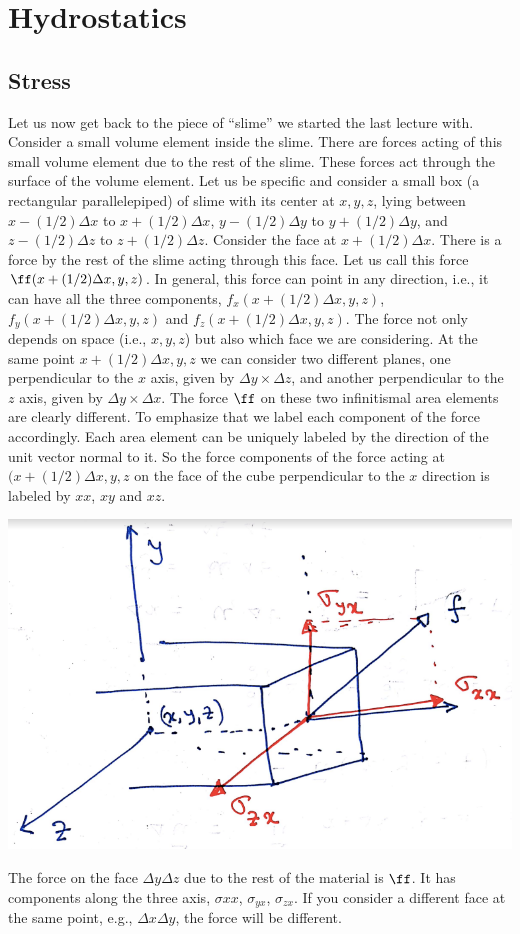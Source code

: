 \chapter{Hydrostatics}
\label{ch:hydrostatics}
\section{Stress}
Let us now get back to the piece of ``slime'' we started the last
lecture with. Consider a small volume element inside the slime. There
are forces acting of this small volume element due to the rest of the
slime. These forces act through the surface of the volume element.
Let us be specific and consider a small box (a rectangular
parallelepiped) of slime with its center at $x,y,z$, lying between 
$x-(1/2)\Delta x $ to $x+(1/2)\Delta x$, 
$y-(1/2)\Delta y$ to $y+(1/2)\Delta y$, and 
$z-(1/2)\Delta z$ to $z+(1/2)\Delta z$.
Consider the face at $x+(1/2)\Delta x$. There is a force by the rest of the
slime acting through this face. Let us call this force
$\ff(x+(1/2)\Delta x,y,z)$. In general, this force can point in
any direction, i.e., it can have all the three components,
$f_x(x+(1/2)\Delta x,y,z)$, $f_y(x+(1/2)\Delta x,y,z)$ and 
$f_z(x+(1/2)\Delta x,y,z)$. The force not only depends on space
(i.e., $x,y,z$) but also which face we are considering. At the same
point $x+(1/2)\Delta x,y,z$ we can consider two different planes,
one perpendicular to the $x$ axis, given by $\Delta y \times \Delta
z$, and another perpendicular to the $z$ axis, given by $\Delta y
\times \Delta x$. The force $\ff$ on these two infinitismal area
elements are clearly different. To emphasize that we label each
component of the force accordingly. Each area element can be uniquely labeled by
the direction of the unit vector normal to it. So the force components
of the force acting at $(x+(1/2)\Delta x,y,z$ on the face of the
cube perpendicular to the $x$ direction is labeled by
$xx$, $xy$ and $xz$. 
\begin{marginfigure}
  \includegraphics{figures/stress.png}
 \caption{ The force on the face $\Delta y\Delta z$ due to the rest of
 the material is $\ff$. It has components along the three axis,
 $\sigma{xx}$, $\sigma_{yx}$, $\sigma_{zx}$.  If you consider a 
different face at the same point, e.g., $\Delta x\Delta y$, 
the force will be different.}
  \label{fig:stress}
\end{marginfigure}
